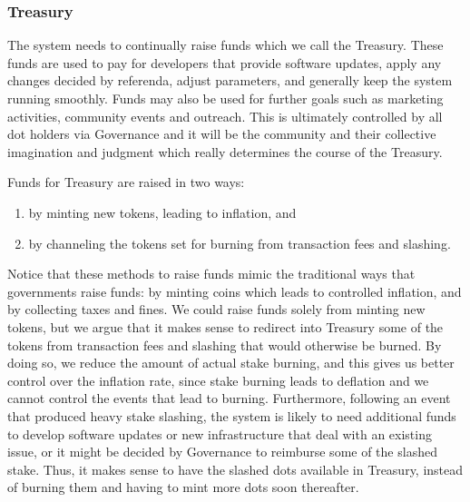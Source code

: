 \subsubsection{Treasury}\label{sec:treasury}

 The system needs to continually raise funds which we call the Treasury.
 These funds are used to pay for developers that provide software updates, apply any changes decided by referenda, adjust parameters, and generally keep the system running smoothly. Funds may also be used for further goals such as marketing activities, community events and outreach. This is ultimately controlled by all dot holders via Governance and it will be the community and their collective imagination and judgment which really determines the course of the Treasury.

Funds for Treasury are raised in two ways:

\begin{enumerate}
\item by minting new tokens, leading to inflation, and
\item by channeling the tokens set for burning from transaction fees and slashing.
\end{enumerate}

 
Notice that these methods to raise funds mimic the traditional ways that governments raise funds: by minting coins which leads to controlled inflation, and by collecting taxes and fines.
We could raise funds solely from minting new tokens, but we argue that it makes sense to redirect into Treasury some of the tokens from transaction fees and slashing that would otherwise be burned. By doing so, we reduce the amount of actual stake burning, and this gives us better control over the inflation rate, since stake burning leads to deflation and we cannot control the events that lead to burning. Furthermore, following an event that produced heavy stake slashing, the system is likely to need additional funds to develop software updates or new infrastructure that deal with an existing issue, or it might be decided by Governance to reimburse some of the slashed stake. Thus, it makes sense to have the slashed dots available in Treasury, instead of burning them and having to mint more dots soon thereafter.
